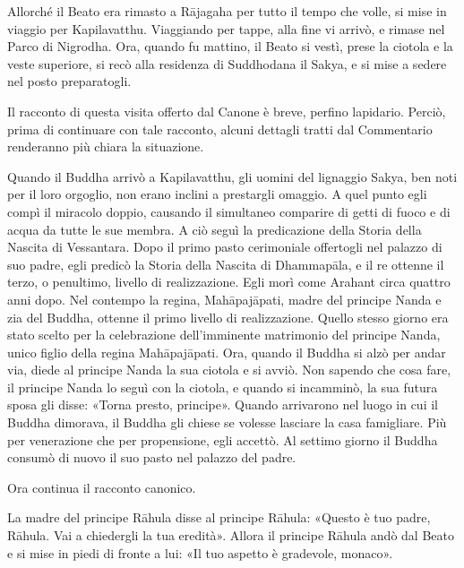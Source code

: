 

 Allorché il Beato era rimasto a Rājagaha per tutto il
tempo che volle, si mise in viaggio per Kapilavatthu. Viaggiando per
tappe, alla fine vi arrivò, e rimase nel Parco di Nigrodha. Ora, quando
fu mattino, il Beato si vestì, prese la ciotola e la veste superiore, si
recò alla residenza di Suddhodana il Sakya, e si mise a sedere nel posto
preparatogli.




 Il racconto di questa visita offerto dal Canone è
breve, perfino lapidario. Perciò, prima di continuare con tale racconto,
alcuni dettagli tratti dal Commentario renderanno più chiara la
situazione.


 Quando il Buddha arrivò a Kapilavatthu, gli uomini
del lignaggio Sakya, ben noti per il loro orgoglio, non erano inclini a
prestargli omaggio. A quel punto egli compì il miracolo doppio, causando
il simultaneo comparire di getti di fuoco e di acqua da tutte le sue
membra. A ciò seguì la predicazione della Storia della Nascita di
Vessantara. Dopo il primo pasto cerimoniale offertogli nel palazzo di
suo padre, egli predicò la Storia della Nascita di Dhammapāla, e il re
ottenne il terzo, o penultimo, livello di realizzazione. Egli morì come
Arahant circa quattro anni dopo. Nel contempo la regina, Mahāpajāpati,
madre del principe Nanda e zia del Buddha, ottenne il primo livello di
realizzazione. Quello stesso giorno era stato scelto per la celebrazione
dell’imminente matrimonio del principe Nanda, unico figlio della regina
Mahāpajāpati. Ora, quando il Buddha si alzò per andar via, diede al
principe Nanda la sua ciotola e si avviò. Non sapendo che cosa fare, il
principe Nanda lo seguì con la ciotola, e quando si incamminò, la sua
futura sposa gli disse: «Torna presto, principe». Quando arrivarono nel
luogo in cui il Buddha dimorava, il Buddha gli chiese se volesse
lasciare la casa famigliare. Più per venerazione che per propensione,
egli accettò. Al settimo giorno il Buddha consumò di nuovo il suo pasto
nel palazzo del padre.


 Ora continua il racconto canonico.


 La madre del principe Rāhula disse al principe Rāhula:
«Questo è tuo padre, Rāhula. Vai a chiedergli la tua eredità». Allora il
principe Rāhula andò dal Beato e si mise in piedi di fronte a lui: «Il
tuo aspetto è gradevole, monaco».


